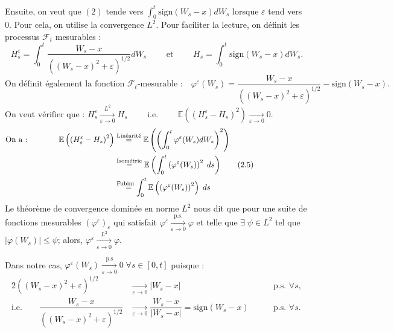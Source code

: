 \documentclass[openany]{book}
\makeatletter
\newcommand{\F}{\mathscr{F}}
\newcommand{\E}{\mathbb{E}}
\newcommand{\1}{\mathbbm{1}}
\newcommand{\sign}{\text{sign}}
\renewenvironment{proof}[1][\textbf{\textit{Démonstration}}]{%
  \par\pushQED{\qed}%
  \normalfont\topsep6\p@\@plus6\p@\relax
  \trivlist\item[\hskip\labelsep
    #1\@addpunct{.}]\ignorespaces
}{%
  \popQED\endtrivlist\@endpefalse
}
\theoremstyle{thmfont}
\theoremstyle{deffont}
\theoremstyle{thmfont}
\theoremstyle{deffont}
\makeatother
\begin{document}
\begin{proof}
  
  \noindent Ensuite, on veut que $(2)$ tende vers $\int_0^t \sign(W_s-x)dW_s$ lorsque $\varepsilon$ tend vers $0$. Pour cela, on utilise la convergence $L^2$. Pour faciliter la lecture, on définit les processus $\F_t$ mesurables :
  $$H^\varepsilon_s = \int_0^t \dfrac{W_s-x}{((W_s-x)^2 +\varepsilon)^{1/2}}dW_s \qquad\text{ et }\qquad H_s =  \int_0^t \sign(W_s -x)dW_s.$$\vspace{-4mm}
  $$\text{On définit également la fonction $\F_t$-mesurable :}\quad\varphi^\varepsilon(W_s) =  \dfrac{W_s-x}{((W_s-x)^2 +\varepsilon)^{1/2}} - \sign(W_s -x).\qquad\qquad\qquad\qquad\qquad\qquad$$
  $$\text{On veut vérifier que : }H^\varepsilon_s \xrightarrow[\varepsilon \to 0]{L^2} H_s \qquad \text{ i.e. } \qquad \E\left(\left(H^\varepsilon_s - H_s\right)^2\right) \xrightarrow[\varepsilon \to 0]{} 0.\qquad\qquad\qquad\qquad\qquad\qquad$$
\begin{align*}\label{arg:cvL2}
  \text{On a :}\qquad\qquad
  \E\left(\left(H^\varepsilon_s - H_s\right)^2\right) &\overset{\text{Linéarité}}{=} \E \left( \left(\int_0^t\varphi^\varepsilon(W_s)dW_s\right)^2 \right)\qquad\qquad\qquad\qquad\qquad\\
  &\overset{\text{Isométrie}}{=} \E\left( \int_0^t\left( \varphi^\varepsilon(W_s) \right)^2 \; ds\right) \tag{2.5}\refstepcounter{equation}\\
  &\overset{\text{Fubini}}{\;\;\;=}\int_0^t\E\left( \left(\varphi^\varepsilon(W_s)\right)^2 \right)\; ds\\
\end{align*}
\noindent Le théorème de convergence dominée en norme $L^2$ nous dit que pour une suite de fonctions mesurables $(\varphi^\varepsilon)_\varepsilon$ qui satisfait $\varphi^\varepsilon \xrightarrow[\varepsilon\to0]{\text{p.s.}}\varphi$ et telle que $\exists\; \psi \in L^2$ tel que $|\varphi(W_s)| \leq \psi$; alors, $\varphi^\varepsilon \xrightarrow[\varepsilon \to 0]{L^2} \varphi.$


\noindent Dans notre cas, $\varphi^\varepsilon(W_s) \xrightarrow[\varepsilon \to 0]{\text{p.s}} 0\;\forall s \in [0,t]$ puisque :
\begin{alignat*}{2}
((W_s-x)^2 +\varepsilon)^{1/2} &\xrightarrow[\varepsilon\to 0]{} |W_s - x| \;\quad&&\text{p.s. } \forall s,\\
\text{i.e.}\qquad \dfrac{W_s-x}{((W_s-x)^2 +\varepsilon)^{1/2}} &\xrightarrow[\varepsilon \to 0]{} \dfrac{W_s-x}{|W_s - x|} = \sign(W_s -x)\quad\;&&\text{p.s. } \forall s.
\end{alignat*}


\end{proof}
\end{document}
